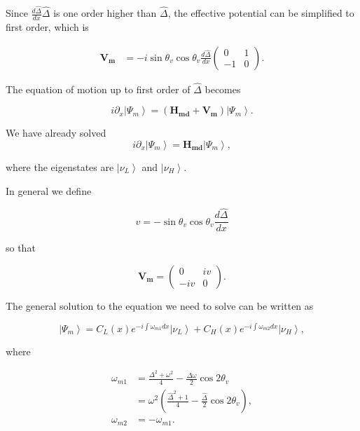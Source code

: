 \documentclass{tufte-handout}
\newcommand{\ket}[1]{\left| #1\right\rangle}
\begin{document}
Since $\frac{d\hat\Delta}{dx} \hat\Delta$ is one order higher than $\hat\Delta$, the effective potential can be simplified to first order, which is

\begin{align*}
\mathbf{V_m} & = - i\sin\theta_v \cos\theta_v \frac{d\hat\Delta}{dx} \begin{pmatrix}
0 & 1 \\
-1 & 0
\end{pmatrix}.
\end{align*}

The equation of motion up to first order of $\hat\Delta$ becomes

\begin{equation*}
i\partial_x\ket{\Psi_m} = (\mathbf{H_{md}} + \mathbf{V_m})\ket{\Psi_m}.
\end{equation*}

We have already solved
\begin{equation*}
i\partial_x\ket{\Psi_m} = \mathbf{H_{md}} \ket{\Psi_m},
\end{equation*}

where the eigenstates are $\ket{\nu_L}$ and $\ket{\nu_H}$.


In general we define

\begin{equation*}
v = -\sin\theta_v \cos\theta_v\frac{d\hat\Delta}{dx}
\end{equation*}

so that

\begin{equation*}
\mathbf{V_m} = \begin{pmatrix}
0 & i v \\
-i v & 0
\end{pmatrix}.
\end{equation*}

The general solution to the equation we need to solve can be written as

\begin{equation*}
\ket{\Psi_m} = C_L(x) e^{-i\int \omega_{m1} dx} \ket{\nu_L} + C_H(x) e^{-i\int \omega_{m2} dx} \ket{\nu_H},
\end{equation*}

where

\begin{align*}
\omega_{m1} &= \frac{\Delta^2 + \omega^2}{4}-\frac{\Delta \omega}{2} \cos 2\theta_v  \\
& = \omega^2\left( \frac{\hat\Delta^2 + 1}{4} - \frac{\hat\Delta}{2}\cos 2\theta_v \right), \\
\omega_{m2} & = - \omega_{m1}.
\end{align*}
\end{document}
